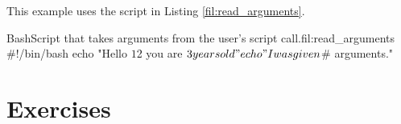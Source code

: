 This example uses the script  in Listing \ref{fil:read_arguments}.

\begin{source_code_float}{Bash}{Script that takes arguments from the user's script call.}{fil:read_arguments}
#!/bin/bash
echo "Hello $1 $2 you are $3 years old"
echo "I was given $# arguments."
\end{source_code_float}


\section*{Exercises}

